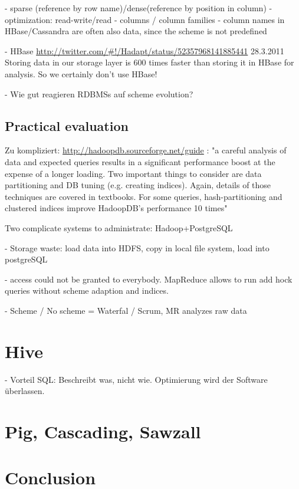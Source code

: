 \documentclass[12pt,a4paper]{scrartcl}		%
\begin{document}
    - sparse (reference by row name)/dense(reference by position in column)
    - optimization: read-write/read
    - columns / column families
    - column names in HBase/Cassandra are often also data, since the scheme is not predefined

  - HBase 
    \url{http://twitter.com/#!/Hadapt/status/52357968141885441}
    28.3.2011 Storing data in our storage layer is 600 times faster than storing it in HBase for analysis. So we certainly don't use HBase!

- Wie gut reagieren RDBMSs auf scheme evolution?

\subsection{Practical evaluation}

Zu kompliziert:
\url{http://hadoopdb.sourceforge.net/guide} :
"a careful analysis of data and expected queries results in a significant performance boost at the expense of a longer loading. Two important things to consider are data partitioning and DB tuning (e.g. creating indices). Again, details of those techniques are covered in textbooks. For some queries, hash-partitioning and clustered indices improve HadoopDB's performance 10 times"

Two complicate systems to administrate: Hadoop+PostgreSQL

  - Storage waste:
    load data into HDFS, copy in local file system, load into postgreSQL

- access could not be granted to everybody. MapReduce allows to run add hock queries without scheme adaption and indices.

- Scheme / No scheme = Waterfal / Scrum, MR analyzes raw data


\section{Hive}

- Vorteil SQL: Beschreibt was, nicht wie. Optimierung wird der Software überlassen.
\section{Pig, Cascading, Sawzall}

\section{Conclusion}



{}

\end{document}
